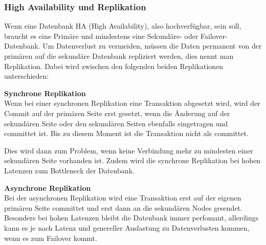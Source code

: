 
\subsubsection{High Availability und Replikation}
\begin{flushleft}
    Wenn eine Datenbank HA (High Availability), also hochverfügbar, sein soll, braucht es eine Primäre und mindestens eine Sekundäre- oder \Gls{Failover}-Datenbank.
    Um Datenverlust zu vermeiden, müssen die Daten permanent von der primären auf die sekundäre Datenbank repliziert werden, dies nennt man Replikation\cite{D9RDXENY}.
    Dabei wird zwischen den folgenden beiden Replikationen unterschieden:
\end{flushleft}
\begin{flushleft}
    \textbf{Synchrone Replikation}\\
    Wenn bei einer synchronen Replikation eine Transaktion abgesetzt wird, wird der Commit auf der primären Seite erst gesetzt, wenn die Änderung auf der sekundären Seite oder den sekundären Seiten ebenfalls eingetragen und committet ist.
    Bis zu diesem Moment ist die Transaktion nicht als committet.
    
    Dies wird dann zum Problem, wenn keine Verbindung mehr zu mindesten einer sekundären Seite vorhanden ist.
    Zudem wird die synchrone Replikation bei hohen Latenzen zum Bottleneck der Datenbank.
\end{flushleft}
\begin{flushleft}
    \textbf{Asynchrone Replikation}\\
    Bei der asynchronen Replikation wird eine Transaktion erst auf der eigenen primären Seite committet und erst dann an die sekundären Nodes gesendet.
    Besonders bei hohen Latenzen bleibt die Datenbank immer perfomant, allerdings kann es je nach Latenz und genereller Auslastung zu Datenverlusten kommen, wenn es zum \Gls{Failover} kommt.
\end{flushleft}